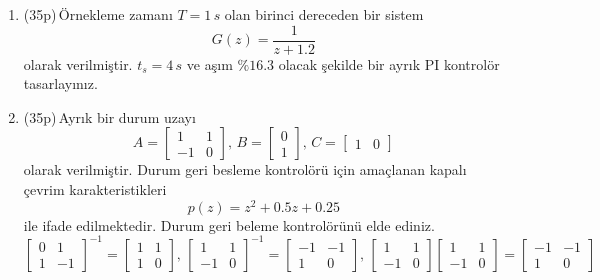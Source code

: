 \begin{enumerate}[\bfseries S1.]
    \item (35p)\,Örnekleme zamanı $T=1\,s$ olan birinci dereceden bir sistem 
    \begin{equation}
        G(z)=\frac{1}{z+1.2}
    \end{equation}
    olarak verilmiştir. $t_s=4\,s$ ve aşım $\%16.3$ olacak şekilde bir ayrık PI kontrolör tasarlayınız.
    \item (35p)\,Ayrık bir durum uzayı
    \begin{equation}
        A=\begin{bmatrix}1& 1\\-1&0\end{bmatrix},\,B=\begin{bmatrix}0\\1\end{bmatrix},\,C=\begin{bmatrix}1&0\end{bmatrix}
    \end{equation}
    olarak verilmiştir. Durum geri besleme kontrolörü için amaçlanan kapalı çevrim karakteristikleri
    \begin{equation}
        p(z)=z^2+0.5z+0.25
    \end{equation}
    ile ifade edilmektedir. Durum geri beleme kontrolörünü elde ediniz.
    \begin{equation*}
        \begin{bmatrix}0& 1\\1&-1\end{bmatrix}^{-1}=\begin{bmatrix}1& 1\\1&0\end{bmatrix},\,
        \begin{bmatrix}1& 1\\-1&0\end{bmatrix}^{-1}=\begin{bmatrix}-1& -1\\1&0\end{bmatrix},\,
        \begin{bmatrix}1& 1\\-1&0\end{bmatrix}\begin{bmatrix}1& 1\\-1&0\end{bmatrix}=\begin{bmatrix}-1& -1\\1&0\end{bmatrix}

\end{equation*}
\end{enumerate}
